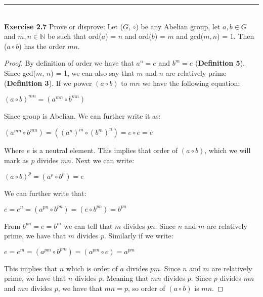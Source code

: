 \documentclass[a4paper]{article}
\begin{document}
\noindent\rule{12cm}{0.4pt}\\
\noindent \textbf{Exercise 2.7} Prove or disprove: Let ($G$, $\circ$) be any Abelian group, let $a, b \in G$ and $m,n \in \mathbb{N}$ be such that ord($a$) = $n$ and ord($b$) = $m$ and gcd($m,n$) = $1$. Then ($a \circ b$) has the order $mn$.
\begin{proof}
By definition of order we have that $a^n=e$ and $b^m=e$ (\textbf{Definition 5}). Since gcd($m$, $n$) = 1, we can also say that $m$ and $n$ are relatively prime (\textbf{Definition 3}). If we power $(a \circ b)$ to $mn$ we have the following equation:
\begin{center}
$(a \circ b)^{mn}=(a^{mn} \circ b^{mn})$
\end{center}
Since group is Abelian. We can further write it as:
\begin{center}
$(a^{mn} \circ b^{mn})=((a^n)^m \circ (b^m)^n)=e \circ e=e$
\end{center}
Where $e$ is a neutral element. This implies that order of $(a \circ b)$, which we will mark as $p$ divides $mn$. Next we can write:
\begin{center}
$(a \circ b)^p=(a^{p} \circ b^{p})=e$
\end{center}
We can further write that:
\begin{center}
$e=e^n=(a^{pn} \circ b^{pn})= (e \circ b^{pn}) =b^{pn}$
\end{center}
From $b^{pn}=e=b^m$ we can tell that $m$ divides $pn$. Since $n$ and $m$ are relatively prime, we have that $m$ divides $p$. Similarly if we write:
\begin{center}
$e = e^m=(a^{pm} \circ b^{pm})= (a^{pm} \circ e) =a^{pm}$
\end{center}
This implies that $n$ which is order of $a$ divides $pm$. Since $n$ and $m$ are relatively prime, we have that $n$ divides $p$. Meaning that $mn$ divides $p$. Since $p$ divides $mn$ and $mn$ divides $p$, we have that $mn=p$, so order of $(a \circ b)$ is $mn$.
\end{proof}
\end{document}
